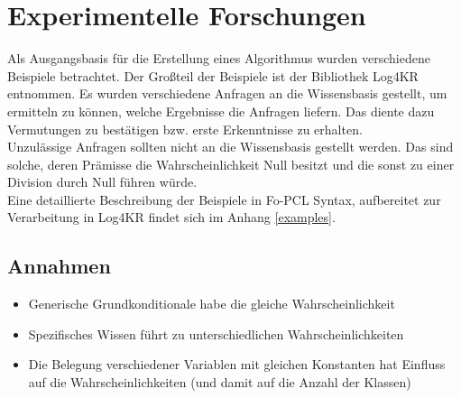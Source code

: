 \documentclass[a4paper, 11pt]{book}
\begin{document}
	
\chapter{Experimentelle Forschungen} \label{Experim. Forschungen}
Als Ausgangsbasis für die Erstellung eines Algorithmus wurden verschiedene Beispiele betrachtet. Der Großteil der Beispiele ist der Bibliothek Log4KR entnommen. Es wurden verschiedene Anfragen an die Wissensbasis gestellt, um ermitteln zu können, welche Ergebnisse die Anfragen liefern. Das diente dazu Vermutungen zu bestätigen bzw. erste Erkenntnisse zu erhalten.\\
Unzulässige Anfragen sollten nicht an die Wissensbasis gestellt werden. Das sind solche, deren Prämisse die Wahrscheinlichkeit Null besitzt und die sonst zu einer Division durch Null führen würde.\\
Eine detaillierte Beschreibung der Beispiele in Fo-PCL Syntax, aufbereitet zur Verarbeitung in Log4KR findet sich im Anhang \ref{examples}.

\section{Annahmen}

\begin{itemize}
	\item Generische Grundkonditionale habe die gleiche Wahrscheinlichkeit
	\item Spezifisches Wissen führt zu unterschiedlichen Wahrscheinlichkeiten
	\item Die Belegung verschiedener Variablen mit gleichen Konstanten hat Einfluss auf die Wahrscheinlichkeiten (und damit auf die Anzahl der Klassen)
	
\end{itemize}


\fontsize{11pt}{13.2pt}\selectfont

\setlongtables
\end{document}
